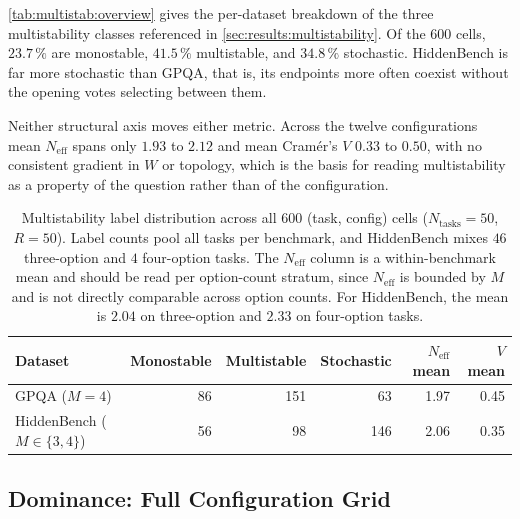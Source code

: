 \autoref{tab:multistab:overview} gives the per-dataset breakdown of the three
multistability classes referenced in \autoref{sec:results:multistability}. Of the
600 cells, $23.7\,\%$ are monostable, $41.5\,\%$ multistable, and $34.8\,\%$
stochastic. HiddenBench is far more stochastic than GPQA, that is, its endpoints
more often coexist without the opening votes selecting between them.

Neither structural axis moves either metric. Across the twelve configurations mean
$N_{\mathrm{eff}}$ spans only $1.93$ to $2.12$ and mean Cram\'er's $V$ $0.33$
to $0.50$, with no consistent gradient in $W$ or topology, which is the basis for
reading multistability as a property of the question rather than of the
configuration.

\begin{table}[H]
\centering
\small
\begin{tabular}{lrrrrr}
\toprule
Dataset & Monostable & Multistable & Stochastic &
  $N_{\mathrm{eff}}$ mean & $V$ mean \\
\midrule
GPQA ($M=4$)                  & 86 & 151 &  63 & 1.97 & 0.45 \\
HiddenBench ($M \in \{3,4\}$) & 56 &  98 & 146 & 2.06 & 0.35 \\
\bottomrule
\end{tabular}
\caption[Multistability label distribution by dataset]{Multistability label
         distribution across all 600 (task, config) cells
         ($N_{\mathrm{tasks}} = 50$, $R = 50$). Label counts pool all tasks per
         benchmark, and HiddenBench mixes $46$ three-option and $4$ four-option tasks.
         The $N_{\mathrm{eff}}$ column is a within-benchmark mean and should be
         read per option-count stratum, since $N_{\mathrm{eff}}$ is bounded by $M$
         and is not directly comparable across option counts. For HiddenBench,
         the mean is $2.04$ on three-option and $2.33$ on four-option tasks.}
\label{tab:multistab:overview}
\end{table}

\subsection{Dominance: Full Configuration Grid}
\label{app:dom:supp}


